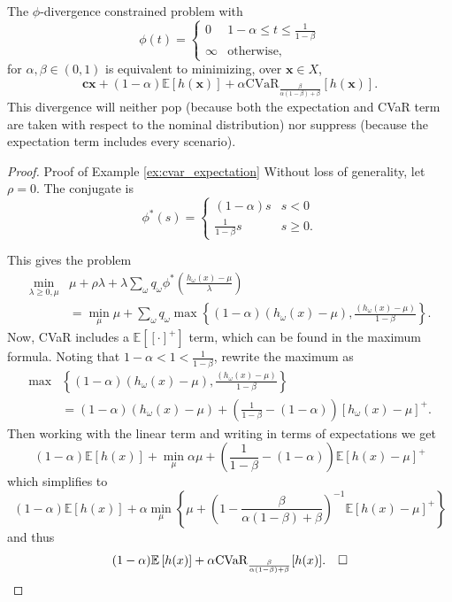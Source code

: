 \documentclass[opre,nonblindrev]{informs3} %
\newcommand{\E}{\mathbb{E}}
\newcommand{\e}[1]{\E \left[ #1 \right]}
\newcommand{\x}{\mathbf{x}}
\renewcommand{\c}{\mathbf{c}}
\begin{document}
\begin{example}
	\label{ex:cvar_expectation}
	The $\phi$-divergence constrained problem with
	\[
		\phi(t) = 
		\begin{cases}
			0 & 1-\alpha \leq t \leq \frac{1}{1-\beta} \\
			\infty & \text{otherwise},
		\end{cases}
	\]
	for $\alpha,\beta \in (0,1)$ is equivalent to minimizing, over $\x \in X$,
	\[
		\c\x + (1-\alpha)\e{h(\x)} + \alpha \mbox{CVaR}_{\frac{\beta}{\alpha(1-\beta)+\beta}}[h(\x)].
	\]
	This divergence will neither pop (because both the expectation and CVaR term are taken with respect to the nominal distribution) nor suppress (because the expectation term includes every scenario).
\end{example}

\begin{proof}{\sc Proof of Example \ref{ex:cvar_expectation}}
	Without loss of generality, let $\rho = 0$.
	The conjugate is
	\[
		\phi^*(s) =
		\begin{cases}
			(1-\alpha) s & s < 0 \\
			\frac{1}{1-\beta} s & s \geq 0.
		\end{cases}
	\]
	
	This gives the problem
	\begin{align*}
		\min_{\lambda \geq 0,\mu} & \mu + \rho \lambda + \lambda \sum_\omega q_\omega \phi^*\left(\frac{h_\omega(x)-\mu}{\lambda}\right) \\
		& = \min_\mu \mu + \sum_\omega q_\omega \max \left\{ (1-\alpha)(h_\omega(x)-\mu), \frac{(h_\omega(x)-\mu)}{1-\beta} \right\}.
	\end{align*}
	Now, CVaR includes a $\e{[\cdot]^+}$ term, which can be found in the maximum formula.
	Noting that $1-\alpha < 1 < \frac{1}{1-\beta}$, rewrite the maximum as
	\begin{align*}
		\max & \left\{ (1-\alpha)(h_\omega(x)-\mu), \frac{(h_\omega(x)-\mu)}{1-\beta} \right\} \\
		& = (1-\alpha)(h_\omega(x)-\mu) + \left( \frac{1}{1-\beta} - (1-\alpha) \right) \left[ h_\omega(x)-\mu \right]^+.
	\end{align*}
	Then working with the linear term and writing in terms of expectations we get
	\[
		(1-\alpha)\e{h(x)} + \min_\mu \alpha\mu + \left( \frac{1}{1-\beta} - (1-\alpha) \right) \e{h(x)-\mu}^+
	\]
	which simplifies to
	\[
		(1-\alpha)\e{h(x)} + \alpha \min_\mu \left\{ \mu + \left(1 - \frac{\beta}{\alpha(1-\beta)+\beta}\right)^{-1} \e{h(x)-\mu}^+ \right\}
	\]
	and thus
	\[
		(1-\alpha)\e{h(x)} + \alpha \mbox{CVaR}_{\frac{\beta}{\alpha(1-\beta)+\beta}}[h(x)]. \Halmos
	\]
\end{proof}
\end{document}
